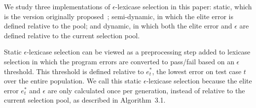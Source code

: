 \documentclass[twoside]{article}
\begin{document}
We study three implementations of $\epsilon$-lexicase selection in this paper: static, which is the version originally proposed~\citep{la_cava_automatic_2016}; semi-dynamic, in which the elite error is defined relative to the pool; and dynamic, in which both the elite error and $\epsilon$ are defined relative to the current selection pool. 

Static $\epsilon$-lexicase selection can be viewed as a preprocessing step added to lexicase selection in which the program errors are converted to pass/fail based on an $\epsilon$ threshold. This threshold is defined relative to $e^*_t$, the lowest error on test case $t$ over the entire population. We call this static $\epsilon$-lexicase selection because the elite error $e^*_t$ and $\epsilon$ are only calculated once per generation, instead of relative to the current selection pool, as described in Algorithm~3.1.
\end{document}
